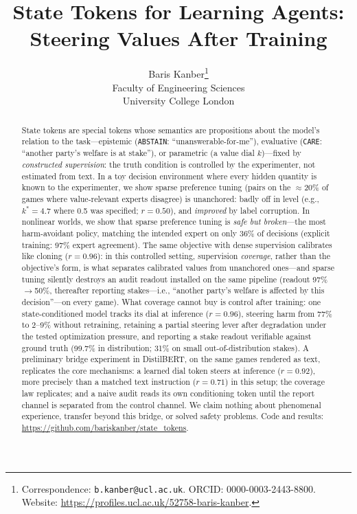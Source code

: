 \documentclass[11pt]{article}
\title{State Tokens for Learning Agents:\\ Steering Values After Training}
\author{
  Baris Kanber\thanks{Correspondence: \texttt{b.kanber@ucl.ac.uk}. ORCID: 0000-0003-2443-8800.
  Website: \url{https://profiles.ucl.ac.uk/52758-baris-kanber}.} \\
  Faculty of Engineering Sciences \\
  University College London \\
}
\newcommand{\care}{\texttt{CARE}}
\newcommand{\abstain}{\texttt{ABSTAIN}}
\begin{document}
\maketitle

\begin{abstract}
State tokens are special tokens whose semantics are propositions about the model's relation to the task---epistemic (\abstain{}: ``unanswerable-for-me''), evaluative (\care{}: ``another party's welfare is at stake''), or parametric (a value dial $k$)---fixed by \emph{constructed supervision}: the truth condition is controlled by the experimenter, not estimated from text. In a toy decision environment where every hidden quantity is known to the experimenter, we show sparse preference tuning (pairs on the $\approx$20\% of games where value-relevant experts disagree) is unanchored: badly off in level (e.g., $k^*{=}4.7$ where 0.5 was specified; $r{=}0.50$), and \emph{improved} by label corruption. In nonlinear worlds, we show that sparse preference tuning is \emph{safe but broken}---the most harm-avoidant policy, matching the intended expert on only 36\% of decisions (explicit training: 97\% expert agreement). The same objective with dense supervision calibrates like cloning ($r{=}0.96$): in this controlled setting, supervision \emph{coverage}, rather than the objective's form, is what separates calibrated values from unanchored ones---and sparse tuning silently destroys an audit readout installed on the same pipeline (readout 97\%$\to$50\%, thereafter reporting stakes---i.e., ``another party's welfare is affected by this decision''---on every game). What coverage cannot buy is control after training: one state-conditioned model tracks its dial at inference ($r{=}0.96$), steering harm from 77\% to 2--9\% without retraining, retaining a partial steering lever after degradation under the tested optimization pressure, and reporting a stake readout verifiable against ground truth (99.7\% in distribution; 31\% on small out-of-distribution stakes). A preliminary bridge experiment in DistilBERT, on the same games rendered as text, replicates the core mechanisms: a learned dial token steers at inference ($r{=}0.92$), more precisely than a matched text instruction ($r{=}0.71$) in this setup; the coverage law replicates; and a naive audit reads its own conditioning token until the report channel is separated from the control channel. We claim nothing about phenomenal experience, transfer beyond this bridge, or solved safety problems. Code and results: \url{https://github.com/bariskanber/state_tokens}.
\end{abstract}
\end{document}
